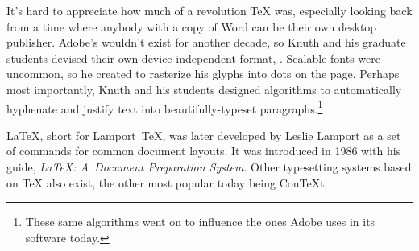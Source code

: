 It's hard to appreciate how much of a revolution \TeX{} was,
especially looking back from a time where anybody with a copy
of Word can be their own desktop publisher.
Adobe's  wouldn't exist for another decade, so Knuth
and his graduate students devised their own device-independent format,
.
Scalable fonts were uncommon, so he created \MF{} to rasterize his glyphs
into dots on the page.
Perhaps most importantly, Knuth and his students designed algorithms
to automatically hyphenate and justify text into
beautifully-typeset paragraphs.\punckern\footnote{These same algorithms went
on to influence the ones Adobe uses in its software today.\punckern{}}

\LaTeX{}, short for Lamport~\TeX{}, was later developed by Leslie Lamport
as a set of commands for common document layouts.
It was introduced in 1986 with his guide,
\textit{\LaTeX: A~Document Preparation System}.
Other typesetting systems based on \TeX{} also exist,
the other most popular today being Con\TeX{}t.

